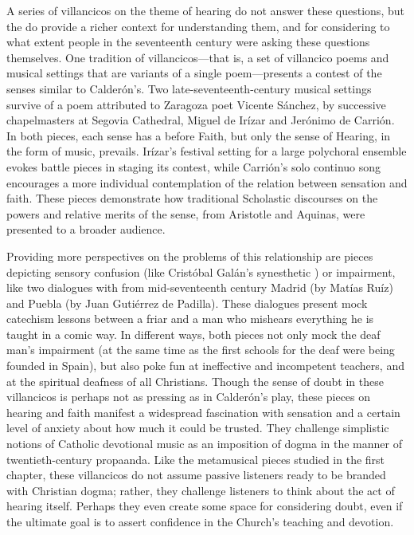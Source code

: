\documentclass[tt]{vcbook-proposal}
\begin{document}
A series of villancicos on the theme of hearing do not answer these questions, but the do provide a richer context for understanding them, and for considering to what extent people in the seventeenth century were asking these questions themselves.
One tradition of villancicos---that is, a set of villancico poems and musical settings that are variants of a single poem---presents a contest of the senses similar to Calderón's.
Two late-seventeenth-century musical settings survive of a poem attributed to Zaragoza poet Vicente Sánchez, by successive chapelmasters at Segovia Cathedral, Miguel de Irízar and Jerónimo de Carrión.
In both pieces, each sense has a  before Faith, but only the sense of Hearing, in the form of music, prevails.
Irízar's festival setting for a large polychoral ensemble evokes battle pieces in staging its contest, while Carrión's solo continuo song encourages a more individual contemplation of the relation between sensation and faith. 
These pieces demonstrate how traditional Scholastic discourses on the powers and relative merits of the sense, from Aristotle and Aquinas, were presented to a broader audience.

Providing more perspectives on the problems of this relationship are pieces depicting sensory confusion (like Cristóbal Galán's\X{} synesthetic ) or impairment, like two dialogues with  from mid-seventeenth century Madrid (by Matías Ruíz) and Puebla (by Juan Gutiérrez de Padilla).
These dialogues present mock catechism lessons between a friar and a man who mishears everything he is taught in a comic way.
In different ways, both pieces not only mock the deaf man's impairment (at the same time as the first schools for the deaf were being founded in Spain), but also poke fun at ineffective and incompetent teachers, and at the spiritual deafness of all Christians.
Though the sense of doubt in these villancicos is perhaps not as pressing as in Calderón's play, these pieces on hearing and faith manifest a widespread fascination with sensation and a certain level of anxiety about how much it could be trusted.
They challenge simplistic notions of Catholic devotional music as an imposition of dogma in the manner of twentieth-century propaanda. 
Like the metamusical pieces studied in the first chapter, these villancicos do not assume passive listeners ready to be branded with Christian dogma; rather, they challenge listeners to think about the act of hearing itself.
Perhaps they even create some space for considering doubt, even if the ultimate goal is to assert confidence in the Church's teaching and devotion.
\end{document}
